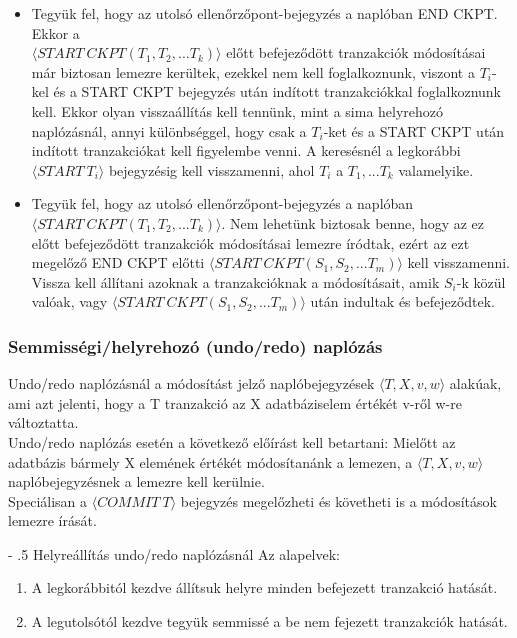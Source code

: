 \documentclass[margin=0px]{article}
\makeatletter
\renewcommand\paragraph{%
	\@startsection{paragraph}{4}{0mm}%
	{-\baselineskip}%
	{.5\baselineskip}%
	{\normalfont\normalsize\bfseries}}
\makeatother
\begin{document}
	\begin{itemize}
		\item	Tegyük fel, hogy az utolsó ellenőrzőpont-bejegyzés a naplóban END CKPT. Ekkor a\\
		$\langle START \ CKPT(T_{1},T_{2},...T_{k}) \rangle$ előtt befejeződött tranzakciók módosításai már biztosan lemezre kerültek, ezekkel nem kell foglalkoznunk, viszont
		a $T_{i}$-kel és a START CKPT bejegyzés után indított tranzakciókkal foglalkoznunk kell. Ekkor olyan visszaállítás kell tennünk,
		mint a sima helyrehozó naplózásnál, annyi különbséggel, hogy csak a $T_{i}$-ket és a START CKPT után indított tranzakciókat
		kell figyelembe venni. A keresésnél a legkorábbi $\langle START \ T_{i}\rangle$ bejegyzésig kell visszamenni, ahol $T_{i}$ a
		$T_{1},...T_{k}$ valamelyike.
		
		\item	Tegyük fel, hogy az utolsó ellenőrzőpont-bejegyzés a naplóban $\langle START \ CKPT(T_{1},T_{2},...T_{k}) \rangle$.
		Nem lehetünk biztosak benne, hogy az ez előtt befejeződött tranzakciók módosításai lemezre íródtak, ezért az ezt megelőző
		END CKPT előtti $\langle START \ CKPT(S_{1},S_{2},...T_{m}) \rangle$ kell visszamenni. Vissza kell állítani azoknak a
		tranzakcióknak a módosításait, amik $S_{i}$-k közül valóak, vagy $\langle START \ CKPT(S_{1},S_{2},...T_{m}) \rangle$
		után indultak és befejeződtek.
	\end{itemize}
	
	\subsubsection{Semmisségi/helyrehozó (undo/redo) naplózás}
	
	Undo/redo naplózásnál a módosítást jelző naplóbejegyzések $\langle T,X,v,w \rangle$ alakúak, ami azt jelenti, hogy a T tranzakció
	az X adatbáziselem értékét v-ről w-re változtatta.\\
	
	Undo/redo naplózás esetén a következő előírást kell betartani: Mielőtt az adatbázis bármely X elemének értékét módosítanánk a lemezen,
	a $\langle T,X,v,w \rangle$ naplóbejegyzésnek a lemezre kell kerülnie.\\
	
	\noindent Speciálisan a $\langle COMMIT \ T\rangle$ bejegyzés megelőzheti és követheti is a módosítások lemezre írását.
	
	\paragraph{Helyreállítás undo/redo naplózásnál}
	\noindent Az alapelvek:
	\begin{enumerate}
		\item	A legkorábbitól kezdve állítsuk helyre minden befejezett tranzakció hatását.
		\item	A legutolsótól kezdve tegyük semmissé a be nem fejezett tranzakciók hatását.
	\end{enumerate}
	
\end{document}
